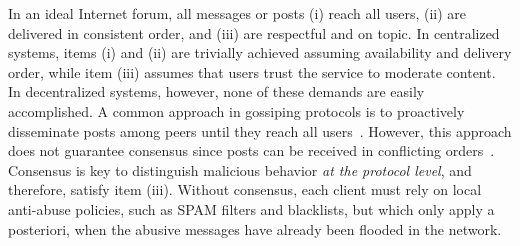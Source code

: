 \documentclass[12pt]{article}
\begin{document}
In an ideal Internet forum, all messages or posts
(i)   reach all users,
(ii)  are delivered in consistent order, and
(iii) are respectful and on topic.
In centralized systems, items (i) and (ii) are trivially achieved assuming
availability and delivery order, while item (iii) assumes that users trust the
service to moderate content.
In decentralized systems, however, none of these demands are easily
accomplished.
A common approach in gossiping protocols is to proactively disseminate posts
among peers until they reach all users~\cite{p2p.survey,p2p.byz}.
However, this approach does not guarantee consensus since posts can be received
in conflicting orders~\cite{p2p.intention}.
%
Consensus is key to distinguish malicious behavior \emph{at the protocol
level}, and therefore, satisfy item (iii).
Without consensus, each client must rely on local anti-abuse policies, such as
SPAM filters and blacklists, but which only apply a posteriori, when the
abusive messages have already been flooded in the network.
%

\end{document}
